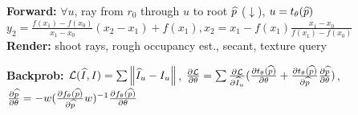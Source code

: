 \textbf{Forward:} $\forall u$, ray from $r_0$ through $u$ to root $\widehat{p}$ ($\downarrow$), $u = t_\theta(\widehat{p})$\\
$y_2 = \frac{f(x_1) - f(x_0)}{x_1 - x_0}(x_2 - x_1) + f(x_1), x_2 = x_1 - f(x_1) \frac{x_1 - x_0}{f(x_1) - f(x_0)}$\\

\textbf{Render:} shoot rays, rough occupancy est., secant, texture query\\

\textbf{Backprob:} $\mathcal{L}(\widehat{I}, I) = \sum \left\lVert \widehat{I}_u - I_u \right\rVert$, $\frac{\partial \mathcal{L}}{\partial \theta} = \sum \frac{\partial \mathcal{L}}{\partial \widehat{I}_u} (\frac{\partial t_\theta (\widehat{p})}{\partial \theta} + \frac{\partial t_\theta(\widehat{p})}{\partial \widehat{p}} \frac{\partial \widehat{p}}{\partial \theta})$,
$\frac{\partial \widehat{p}}{\partial \theta} = -w(\frac{\partial f_\theta(\widehat{p})}{\partial \widehat{p}} w)^{-1} \frac{\partial f_\theta(\widehat{p})}{\partial \theta}$\\



